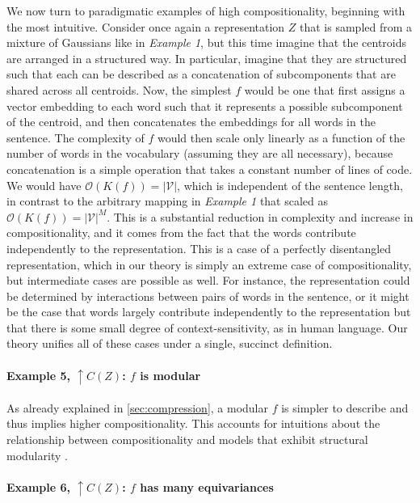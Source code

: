 \documentclass{article} %
\begin{document}
\begin{appendices}
We now turn to paradigmatic examples of high compositionality, beginning with the most intuitive. Consider once again a representation $Z$ that is sampled from a mixture of Gaussians like in \textit{Example 1}, but this time imagine that the centroids are arranged in a structured way. In particular, imagine that they are structured such that each can be described as a concatenation of subcomponents that are shared across all centroids. Now, the simplest $f$ would be one that first assigns a vector embedding to each word such that it represents a possible subcomponent of the centroid, and then concatenates the embeddings for all words in the sentence. The complexity of $f$ would then scale only linearly as a function of the number of words in the vocabulary (assuming they are all necessary), because concatenation is a simple operation that takes a constant number of lines of code. We would have $\mathcal{O}(K(f)) = |\mathcal{V}|$, which is independent of the sentence length, in contrast to the arbitrary mapping in \textit{Example 1} that scaled as $\mathcal{O}(K(f)) = |\mathcal{V}|^M$. This is a substantial reduction in complexity and increase in compositionality, and it comes from the fact that the words contribute independently to the representation. This is a case of a perfectly disentangled representation, which in our theory is simply an extreme case of compositionality, but intermediate cases are possible as well. For instance, the representation could be determined by interactions between pairs of words in the sentence, or it might be the case that words largely contribute independently to the representation but that there is some small degree of context-sensitivity, as in human language. Our theory unifies all of these cases under a single, succinct definition.

\paragraph{Example 5, $\uparrow C(Z)$: $f$ is modular}

As already explained in \cref{sec:compression}, a modular $f$ is simpler to describe and thus implies higher compositionality. This accounts for intuitions about the relationship between compositionality and models that exhibit structural modularity \citep{lepori2023break,goyal2022inductive}.

\paragraph{Example 6, $\uparrow C(Z)$: $f$ has many equivariances}


\end{appendices}
\end{document}
